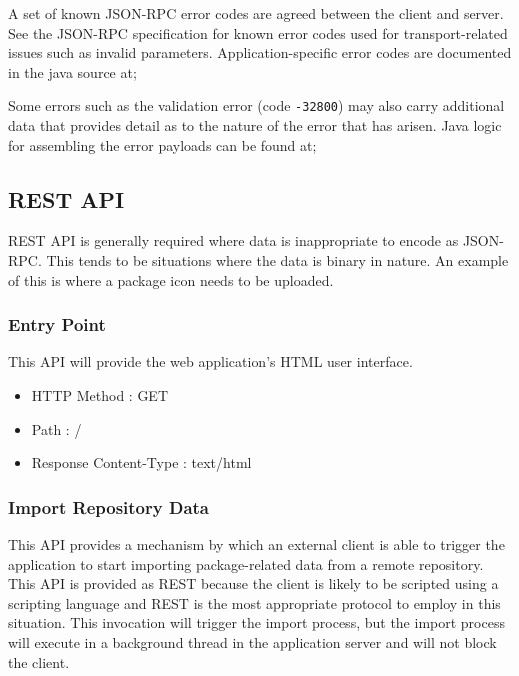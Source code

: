 A set of known JSON-RPC error codes are agreed between the client and server.  See the JSON-RPC specification for known error codes used for transport-related issues such as invalid parameters.  Application-specific error codes are documented in the java source at;


Some errors such as the validation error (code {\tt -32800}) may also carry additional data that provides detail as to the nature of the error that has arisen.  Java logic for assembling the error payloads can be found at;


\subsection{REST API}

REST API is generally required where data is inappropriate to encode as JSON-RPC.  This tends to be situations where the data is binary in nature.  An example of this is where a package icon needs to be uploaded.

\subsubsection{Entry Point}

This API will provide the web application's HTML user interface.

\begin{itemize}
\item HTTP Method : GET
\item Path : /
\item Response Content-Type : text/html
\end{itemize}

\subsubsection{Import Repository Data}
\label{api-importrepositorydata}

This API provides a mechanism by which an external client is able to trigger the application to start importing package-related data from a remote repository.  This API is provided as REST because the client is likely to be scripted using a scripting language and REST is the most appropriate protocol to employ in this situation.  This invocation will trigger the import process, but the import process will execute in a background thread in the application server and will not block the client.

